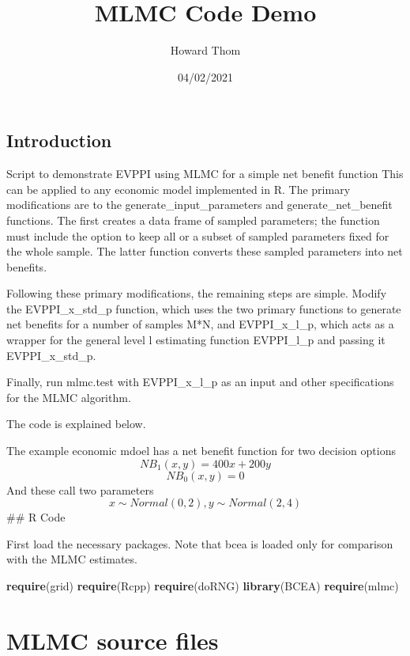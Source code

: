 \documentclass[
]{article}
\title{MLMC Code Demo}
\author{Howard Thom}
\date{04/02/2021}
\newenvironment{Shaded}{\begin{snugshade}}{\end{snugshade}}
\newcommand{\KeywordTok}[1]{\textcolor[rgb]{0.13,0.29,0.53}{\textbf{#1}}}
\newcommand{\NormalTok}[1]{#1}
\begin{document}
\maketitle

\hypertarget{introduction}{%
\subsection{Introduction}\label{introduction}}

Script to demonstrate EVPPI using MLMC for a simple net benefit function
This can be applied to any economic model implemented in R. The primary
modifications are to the generate\_input\_parameters and
generate\_net\_benefit functions. The first creates a data frame of
sampled parameters; the function must include the option to keep all or
a subset of sampled parameters fixed for the whole sample. The latter
function converts these sampled parameters into net benefits.

Following these primary modifications, the remaining steps are simple.
Modify the EVPPI\_x\_std\_p function, which uses the two primary
functions to generate net benefits for a number of samples M*N, and
EVPPI\_x\_l\_p, which acts as a wrapper for the general level l
estimating function EVPPI\_l\_p and passing it EVPPI\_x\_std\_p.

Finally, run mlmc.test with EVPPI\_x\_l\_p as an input and other
specifications for the MLMC algorithm.

The code is explained below.

The example economic mdoel has a net benefit function for two decision
options \[{NB_{1}(x,y) = 400x+200y}\] \[{NB_{0}(x,y) = 0}\] And these
call two parameters \[x\sim Normal(0, 2),  y\sim Normal(2, 4)\] \#\# R
Code

First load the necessary packages. Note that bcea is loaded only for
comparison with the MLMC estimates.

\begin{Shaded}
\begin{Highlighting}[]
\KeywordTok{require}\NormalTok{(grid)}
\KeywordTok{require}\NormalTok{(Rcpp)}
\KeywordTok{require}\NormalTok{(doRNG)}
\KeywordTok{library}\NormalTok{(BCEA)}
\KeywordTok{require}\NormalTok{(mlmc)}
\end{Highlighting}
\end{Shaded}

\hypertarget{mlmc-source-files}{%
\section{MLMC source files}\label{mlmc-source-files}}
\end{document}

